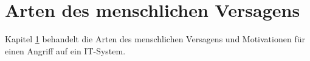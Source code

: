 \newpage
\section{Arten des menschlichen Versagens} \label{menschen}

Kapitel \ref{menschen} behandelt die Arten des menschlichen Versagens und Motivationen
für einen Angriff auf ein IT-System.
